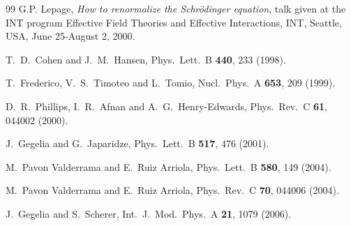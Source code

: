 \documentclass[aps,rmp,nofootinbib,twocolumn,floatfix]{revtex4}
\begin{document}
\begin{thebibliography}{99}
G.P. Lepage,
{\it How to renormalize the Schr\"odinger equation}, talk given at
  the {INT} program {Effective Field Theories and Effective Interactions, INT,
  Seattle, USA, June 25-August 2, 2000}.

  T.~D.~Cohen and J.~M.~Hansen,
  Phys.\ Lett.\  B {\bf 440}, 233 (1998).

  T.~Frederico, V.~S.~Timoteo and L.~Tomio,
  Nucl.\ Phys.\  A {\bf 653}, 209 (1999).

  D.~R.~Phillips, I.~R.~Afnan and A.~G.~Henry-Edwards,
  Phys.\ Rev.\  C {\bf 61}, 044002 (2000).

  J.~Gegelia and G.~Japaridze,
  Phys.\ Lett.\  B {\bf 517}, 476 (2001).

  M.~Pavon Valderrama and E.~Ruiz Arriola,
  Phys.\ Lett.\  B {\bf 580}, 149 (2004).

  M.~Pavon Valderrama and E.~Ruiz Arriola,
  Phys.\ Rev.\  C {\bf 70}, 044006 (2004).

  J.~Gegelia and S.~Scherer,
  Int.\ J.\ Mod.\ Phys.\  A {\bf 21}, 1079 (2006).


\end{thebibliography}
\end{document}

